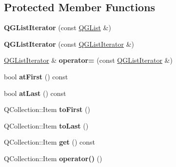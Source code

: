 \subsection*{Protected Member Functions}
\begin{DoxyCompactItemize}
\item 
\mbox{\label{class_q_g_list_iterator_a587dd0b283af87ffb8df810f5206cd02}} 
{\bfseries Q\+G\+List\+Iterator} (const \mbox{\hyperlink{class_q_g_list}{Q\+G\+List}} \&)
\item 
\mbox{\label{class_q_g_list_iterator_a3526a8a9e1b4c106acaaf75a14c65ec8}} 
{\bfseries Q\+G\+List\+Iterator} (const \mbox{\hyperlink{class_q_g_list_iterator}{Q\+G\+List\+Iterator}} \&)
\item 
\mbox{\label{class_q_g_list_iterator_a5320ce8818d1c7f1f9d17adb34ff91ea}} 
\mbox{\hyperlink{class_q_g_list_iterator}{Q\+G\+List\+Iterator}} \& {\bfseries operator=} (const \mbox{\hyperlink{class_q_g_list_iterator}{Q\+G\+List\+Iterator}} \&)
\item 
\mbox{\label{class_q_g_list_iterator_a5f45247f625cd503b58b5aa910172a31}} 
bool {\bfseries at\+First} () const
\item 
\mbox{\label{class_q_g_list_iterator_ae638d28593259703677a3665ff99a5ee}} 
bool {\bfseries at\+Last} () const
\item 
\mbox{\label{class_q_g_list_iterator_a65a49050bd33ce28a4f56f774b2a8133}} 
Q\+Collection\+::\+Item {\bfseries to\+First} ()
\item 
\mbox{\label{class_q_g_list_iterator_a022efda7534a08ad813ac40b2c65c189}} 
Q\+Collection\+::\+Item {\bfseries to\+Last} ()
\item 
\mbox{\label{class_q_g_list_iterator_a7e026f399c5f65247079e098d572ce88}} 
Q\+Collection\+::\+Item {\bfseries get} () const
\item 
\mbox{\label{class_q_g_list_iterator_a02fdcc2e446abf393e499c9049bd3770}} 
Q\+Collection\+::\+Item {\bfseries operator()} ()

\end{DoxyCompactItemize}

